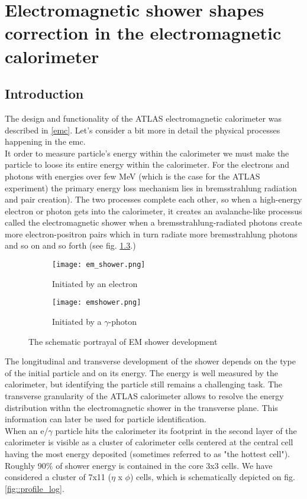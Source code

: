 \chapter{Electromagnetic shower shapes correction in the electromagnetic calorimeter }
	\label{ch::sshapes}

  \section{Introduction}
  The design and functionality of the ATLAS electromagnetic calorimeter was described in \ref{emc}. Let's consider a bit more in detail the physical processes happening in the \gls{emc}. \\
  It order to measure particle's energy within the calorimeter we must make the particle to loose its entire energy within the calorimeter. For the electrons and photons with energies over few MeV (which is the case for the ATLAS experiment) the primary energy loss mechanism lies in bremsstrahlung radiation and pair creation). The two processes complete each other, so when a high-energy electron or photon gets into the calorimeter, it creates an avalanche-like processus called the electromagnetic shower when a bremsstrahlung-radiated photons create more electron-positron pairs which in turn radiate more bremsstrahlung photons and so on and so forth (see fig. \ref{fig::em_shower}.)\\
  	\begin{figure}[htbp]
  	\begin{subfigure}[t]{0.5\textwidth}
  		\texttt{[image: em\_shower.png]}
  		\caption[Started by an electron]{Initiated by an electron}
  		\label{fig::id}
  	\end{subfigure}
  	\hfill
  	\begin{subfigure}[t]{0.5\textwidth} 
  		\texttt{[image: emshower.png]}
  		\caption[Started by a $\gamma$-photon]{Initiated by a $\gamma$-photon}
  		\label{fig::pd}
  	\end{subfigure}
  	\caption{The schematic portrayal of EM shower development}
  	\label{fig::em_shower}
  \end{figure}
    The longitudinal and transverse development of the shower depends on the type of the initial particle and on its energy. The energy is well measured by the calorimeter, but identifying the particle still remains a challenging task. The transverse granularity of the ATLAS calorimeter allows to resolve the energy distribution withn the electromagnetic shower in the transverse plane. This information can later be used for particle identification.\\
  When an e/$\gamma$ particle hits the calorimeter its footprint in the second layer of the calorimeter is visible as a cluster of calorimeter cells centered at the central cell having the most energy deposited (sometimes referred to as "the hottest cell"). Roughly 90$\%$ of shower energy is contained in the core 3x3 cells.  We have considered a cluster of 7x11 ($\eta$ x $\phi$) cells, which is schematically depicted on fig. \ref{fig::profile_log}.
  

